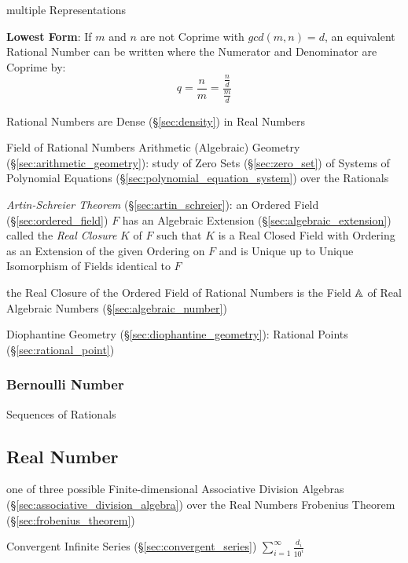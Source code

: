 multiple Representations

\textbf{Lowest Form}: If $m$ and $n$ are not Coprime with $gcd (m,n) =
d$, an equivalent Rational Number can be written where the Numerator
and Denominator are Coprime by:
\[
  q = \frac{n}{m} = \frac{\frac{n}{d}}{\frac{m}{d}}
\]

Rational Numbers are Dense (\S\ref{sec:density}) in Real Numbers

Field of Rational Numbers \fist Arithmetic (Algebraic) Geometry
(\S\ref{sec:arithmetic_geometry}): study of Zero Sets (\S\ref{sec:zero_set}) of
Systems of Polynomial Equations (\S\ref{sec:polynomial_equation_system}) over
the Rationals

\emph{Artin-Schreier Theorem} (\S\ref{sec:artin_schreier}):
an Ordered Field (\S\ref{sec:ordered_field}) $F$ has an Algebraic Extension
(\S\ref{sec:algebraic_extension}) called the \emph{Real Closure} $K$ of $F$
such that $K$ is a Real Closed Field with Ordering as an Extension of the given
Ordering on $F$ and is Unique up to Unique Isomorphism of Fields identical to
$F$

the Real Closure of the Ordered Field of Rational Numbers is the Field
$\mathbb{A}$ of Real Algebraic Numbers (\S\ref{sec:algebraic_number})

\fist Diophantine Geometry (\S\ref{sec:diophantine_geometry}): Rational Points
(\S\ref{sec:rational_point})



\subsubsection{Bernoulli Number}\label{sec:bernoulli_number}

Sequences of Rationals




\subsection{Real Number}\label{sec:real_number}

one of three possible Finite-dimensional Associative Division Algebras
(\S\ref{sec:associative_division_algebra}) over the Real Numbers \fist
Frobenius Theorem (\S\ref{sec:frobenius_theorem})

Convergent Infinite Series (\S\ref{sec:convergent_series}) $\sum_{i =
  1}^{\infty} \frac{d_i}{10^i}$

